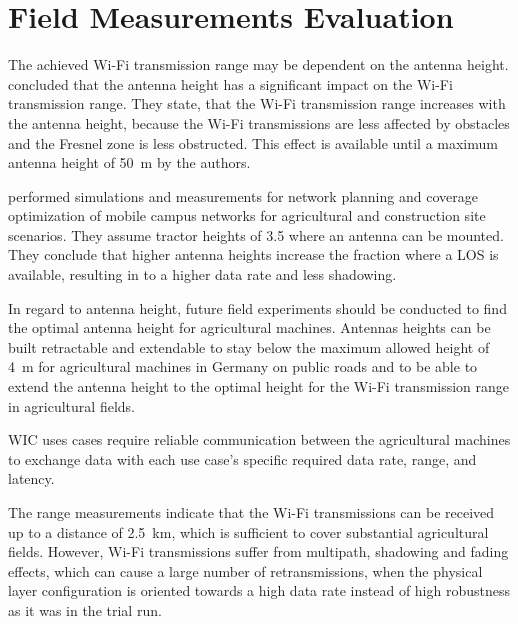 \section{Field Measurements Evaluation}

The achieved Wi-Fi transmission range may be dependent on the antenna height. \textcite{brinkhoff_characterization_2017} concluded that
the antenna height has a significant impact on the Wi-Fi transmission range.
They state, that the Wi-Fi transmission range increases
with the antenna height, because the Wi-Fi transmissions are less affected by obstacles and the Fresnel zone is less obstructed.
This effect is available until a maximum antenna height of \SI{50}{\metre} by the authors.

\textcite{krause_network_2021} performed simulations and measurements for network planning and coverage optimization of mobile campus networks for agricultural and construction site scenarios.
They assume tractor heights of \SI{3.5}{\meters} where an antenna can be mounted.
They conclude that higher antenna heights increase the fraction where a \ac{LOS} is available, resulting in
to a higher data rate and less shadowing.

In regard to antenna height, future field experiments should be conducted to find the optimal antenna height for agricultural machines.
Antennas heights can be built retractable and extendable to stay below the maximum allowed height of \SI{4}{\metre} for agricultural machines in Germany on
public roads and to be able to extend the antenna height to the optimal height for the Wi-Fi transmission range in agricultural fields.


\ac{WIC} uses cases require reliable communication between the agricultural machines to exchange data
with each use case's specific required data rate, range, and latency.

The range measurements indicate that the Wi-Fi transmissions can be received up to a distance of \SI{2.5}{\kilo\metre},
which is sufficient to cover substantial agricultural fields.
However, Wi-Fi transmissions suffer from multipath, shadowing and fading effects, which can cause a large number of retransmissions,
when the physical layer configuration is oriented towards a high data rate instead of high robustness as it was
in the trial run.

